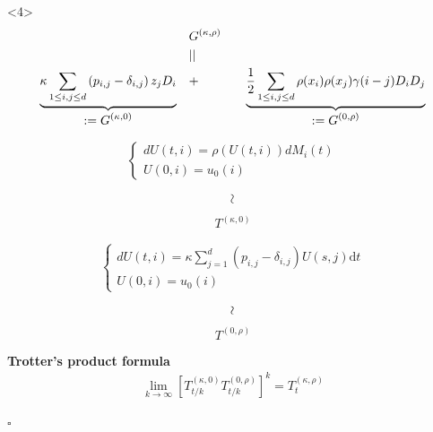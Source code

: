 \documentclass[9pt,table,xcolor=dvipsnames]{beamer}%
\newcommand{\ud}{\ensuremath{\mathrm{d} }}
\newcommand{\myEnd}{\hfill$\square$}
\newcommand{\mySeparateLine}{\begin{center}
 \makebox[\linewidth]{\rule{0.6\paperwidth}{0.4pt}}
\end{center}}
\newcommand*\mystrut[1]{\vrule width0pt height0pt depth#1\relax}
\theoremstyle{definition}
\theoremstyle{plain}
\begin{document}
\begin{frame}<4>
  \begin{eqnarray*}
    &G^{(\kappa,\rho)}&\\
    &||& \\
    \underbrace{\mystrut{1em} \kappa \sum_{1\leq i, j \leq d} \left(p_{i,j}-\delta_{i,j}\right) z_j D_i}_{\displaystyle:= G^{(\kappa,0)}}\quad &+& \quad
    \underbrace{\mystrut{1em} \displaystyle \frac{1}{2}\sum_{1\leq i, j \leq d} \rho(x_i)\rho(x_j) \gamma(i-j) D_iD_j }_{\displaystyle:= G^{(0,\rho)}}
  \end{eqnarray*}
  \begin{minipage}{0.4\textwidth}
    \begin{align*}
    \begin{cases}
      \displaystyle dU(t, i)=\rho\left(U(t, i) \right) d M_i(t)\\
      \displaystyle U(0,i) = u_0(i)
    \end{cases}
    \end{align*}
    \[\rotatebox[origin=c]{90}{$\sim$}\]
    \[T^{(\kappa,0)}\]
  \end{minipage}
  \hfill
  \begin{minipage}{0.5\textwidth}
    \begin{align*}
    \begin{cases}
      dU(t, i)=\kappa \sum_{j=1}^d (p_{i,j}-\delta_{i,j}) U(s,j) \ud t\\
      U(0,i) = u_0(i)
    \end{cases}
    \end{align*}
    \[\rotatebox[origin=c]{90}{$\sim$}\]
    \[T^{(0,\rho)}\]
  \end{minipage}
  \vfill
  \mySeparateLine
  \begin{center}
    \textcolor{yellow!75!black}{\bf Trotter's product formula}\\
    \begin{align*}
      \lim_{k\rightarrow\infty}\left[ T_{t/k}^{(\kappa,0)} T_{t/k}^{(0,\rho)}\right]^k=T_t^{(\kappa,\rho)}
    \end{align*}
  \end{center}
  \myEnd
\end{frame}
\end{document}

